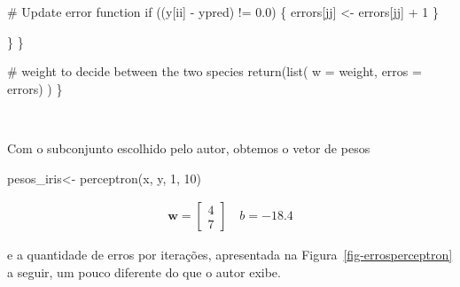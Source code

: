 \documentclass[
  a4paperpaper,
]{article}
\newenvironment{Shaded}{\begin{snugshade}}{\end{snugshade}}
\newcommand{\AttributeTok}[1]{\textcolor[rgb]{0.40,0.45,0.13}{#1}}
\newcommand{\CommentTok}[1]{\textcolor[rgb]{0.37,0.37,0.37}{#1}}
\newcommand{\ControlFlowTok}[1]{\textcolor[rgb]{0.00,0.23,0.31}{#1}}
\newcommand{\DecValTok}[1]{\textcolor[rgb]{0.68,0.00,0.00}{#1}}
\newcommand{\FloatTok}[1]{\textcolor[rgb]{0.68,0.00,0.00}{#1}}
\newcommand{\FunctionTok}[1]{\textcolor[rgb]{0.28,0.35,0.67}{#1}}
\newcommand{\NormalTok}[1]{\textcolor[rgb]{0.00,0.23,0.31}{#1}}
\newcommand{\OtherTok}[1]{\textcolor[rgb]{0.00,0.23,0.31}{#1}}
\newcommand{\SpecialCharTok}[1]{\textcolor[rgb]{0.37,0.37,0.37}{#1}}
\begin{document}
\begin{Shaded}
\begin{Highlighting}[]
                        \CommentTok{\# Update error function}
                        \ControlFlowTok{if}\NormalTok{ ((y[ii] }\SpecialCharTok{{-}}\NormalTok{ ypred) }\SpecialCharTok{!=} \FloatTok{0.0}\NormalTok{) \{}
\NormalTok{                                errors[jj] }\OtherTok{\textless{}{-}}\NormalTok{ errors[jj] }\SpecialCharTok{+} \DecValTok{1}
\NormalTok{                        \}}
                        
\NormalTok{                \}}
\NormalTok{        \}}
        
        \CommentTok{\# weight to decide between the two species }
        \FunctionTok{return}\NormalTok{(}\FunctionTok{list}\NormalTok{(}
          \AttributeTok{w =}\NormalTok{ weight,}
          \AttributeTok{erros =}\NormalTok{ errors)}
\NormalTok{          )}
\NormalTok{\}}
\end{Highlighting}
\end{Shaded}

~

Com o subconjunto escolhido pelo autor, obtemos o vetor de pesos

\begin{Shaded}
\begin{Highlighting}[]
\NormalTok{pesos\_iris}\OtherTok{\textless{}{-}} \FunctionTok{perceptron}\NormalTok{(x, y, }\DecValTok{1}\NormalTok{, }\DecValTok{10}\NormalTok{)}
\end{Highlighting}
\end{Shaded}

\begin{align}
  \boldsymbol{w} = \begin{bmatrix} 4 \\ 7 \end{bmatrix} \quad b = -18.4
 \end{align}

\noindent e a quantidade de erros por iterações, apresentada na
Figura~\ref{fig-errosperceptron} a seguir, um pouco diferente do que o
autor exibe.

~
\end{document}
